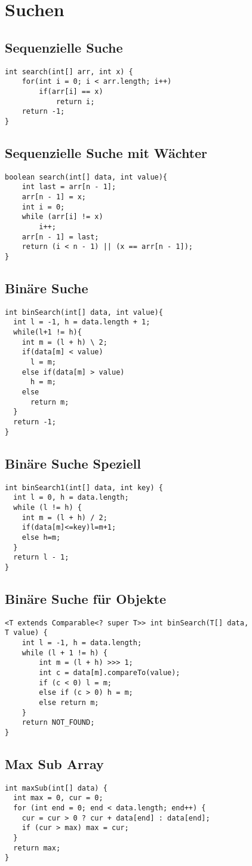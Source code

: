 \section*{Suchen}
\subsection*{Sequenzielle Suche}
\begin{verbatim}
int search(int[] arr, int x) {
    for(int i = 0; i < arr.length; i++) 
        if(arr[i] == x) 
            return i; 
    return -1; 
}
\end{verbatim}
\subsection*{Sequenzielle Suche mit Wächter}
\begin{verbatim}
boolean search(int[] data, int value){
    int last = arr[n - 1];  
    arr[n - 1] = x;  
    int i = 0;  
    while (arr[i] != x)  
        i++;  
    arr[n - 1] = last;
    return (i < n - 1) || (x == arr[n - 1]);
}
\end{verbatim}
\subsection*{Binäre Suche}
\begin{verbatim}
int binSearch(int[] data, int value){
  int l = -1, h = data.length + 1;
  while(l+1 != h){
    int m = (l + h) \ 2;
    if(data[m] < value)
      l = m;
    else if(data[m] > value)
      h = m;
    else
      return m;
  }
  return -1;
}
\end{verbatim}
\columnbreak
\subsection*{Binäre Suche Speziell}
\begin{verbatim}
int binSearch1(int[] data, int key) {
  int l = 0, h = data.length;
  while (l != h) {
    int m = (l + h) / 2;
    if(data[m]<=key)l=m+1;
    else h=m;
  }
  return l - 1; 
}
\end{verbatim}
\subsection*{Binäre Suche für Objekte}
\begin{verbatim}
<T extends Comparable<? super T>> int binSearch(T[] data, 
T value) {
	int l = -1, h = data.length;
	while (l + 1 != h) {
		int m = (l + h) >>> 1;
		int c = data[m].compareTo(value); 
		if (c < 0) l = m;
		else if (c > 0) h = m;
		else return m;
	}
	return NOT_FOUND; 
}
\end{verbatim}
\subsection*{Max Sub Array}
\begin{verbatim}
int maxSub(int[] data) {
  int max = 0, cur = 0;
  for (int end = 0; end < data.length; end++) {
    cur = cur > 0 ? cur + data[end] : data[end];
	if (cur > max) max = cur;
  }
  return max;
}
\end{verbatim}

